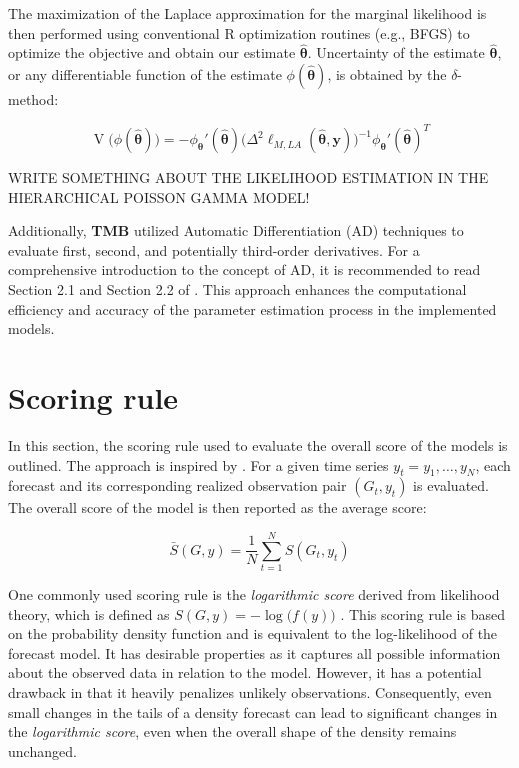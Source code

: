 \documentclass[a4paper,twoside,11pt]{report} %
\DeclareMathOperator{\V}{V}
\theoremstyle{definition}
\theoremstyle{definition}
\theoremstyle{definition}
\theoremstyle{definition}
\theoremstyle{remark}
\begin{document}
The maximization of the Laplace approximation for the marginal likelihood is then performed using conventional R optimization routines (e.g., BFGS) to optimize the objective and obtain our estimate \(\hat{\boldsymbol \theta}\). Uncertainty of the estimate \(\hat{\boldsymbol \theta}\), or any differentiable function of the estimate \(\phi(\hat{\boldsymbol \theta})\), is obtained by the \(\delta\)-method:

\begin{equation}
  \V\big(\phi(\hat{\boldsymbol \theta})\big)=-\phi_{\boldsymbol \theta}'(\hat{\boldsymbol \theta})\Big(\Delta^2 \ell_{M,LA}(\boldsymbol{\hat{\theta}, y})\Big)^{-1} \phi_{\boldsymbol \theta}'(\hat{\boldsymbol \theta})^T
\end{equation}

WRITE SOMETHING ABOUT THE LIKELIHOOD ESTIMATION IN THE HIERARCHICAL POISSON GAMMA MODEL!

Additionally, \textbf{TMB} utilized Automatic Differentiation (AD) techniques \autocite{Griewank_2008} to evaluate first, second, and potentially third-order derivatives. For a comprehensive introduction to the concept of AD, it is recommended to read Section 2.1 and Section 2.2 of \textcite{Fournier_2012}. This approach enhances the computational efficiency and accuracy of the parameter estimation process in the implemented models.

\section{Scoring rule}

In this section, the scoring rule used to evaluate the overall score of the models is outlined. The approach is inspired by \textcite{Blicher_2021}. For a given time series \({y_t}={y_1,\dots,y_N}\), each forecast and its corresponding realized observation pair \((G_t,y_t)\) is evaluated. The overall score of the model is then reported as the average score:

\begin{equation}\label{eq:averageLogS}
\bar{S}(G,y)=\frac{1}{N} \sum_{t=1}^{N}S(G_t,y_t)
\end{equation}

One commonly used scoring rule is the \textit{logarithmic score} derived from likelihood theory, which is defined as \(S(G,y)=-\log\big(f(y)\big)\) \autocite{Good_1992}. This scoring rule is based on the probability density function and is equivalent to the log-likelihood of the forecast model. It has desirable properties as it captures all possible information about the observed data in relation to the model. However, it has a potential drawback in that it heavily penalizes unlikely observations. Consequently, even small changes in the tails of a density forecast can lead to significant changes in the \textit{logarithmic score}, even when the overall shape of the density remains unchanged.
\end{document}
